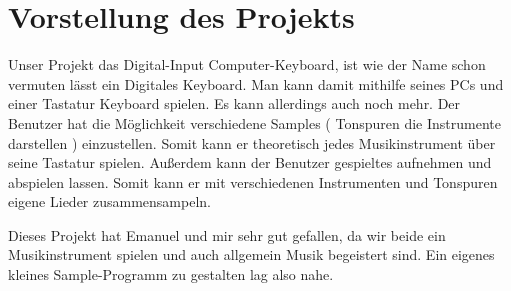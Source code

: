 \section{Vorstellung des Projekts}


Unser Projekt das Digital-Input Computer-Keyboard, ist wie der Name schon vermuten lässt ein Digitales Keyboard. Man kann damit mithilfe seines PCs und einer Tastatur Keyboard spielen. Es kann allerdings auch noch mehr. Der Benutzer hat die Möglichkeit verschiedene Samples ( Tonspuren die Instrumente darstellen ) einzustellen. Somit kann er theoretisch jedes Musikinstrument über seine Tastatur spielen. Außerdem kann der Benutzer gespieltes aufnehmen und abspielen lassen. Somit kann er mit verschiedenen Instrumenten und Tonspuren eigene Lieder zusammensampeln. 

Dieses Projekt hat Emanuel und mir sehr gut gefallen, da wir beide ein Musikinstrument spielen und auch allgemein Musik begeistert sind. Ein eigenes kleines Sample-Programm zu gestalten lag also nahe.
